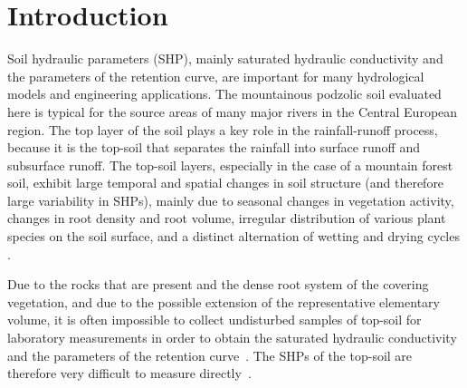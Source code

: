 \documentclass[review]{myarticle}
\begin{document}
\linenumbers

\section{Introduction}%

Soil hydraulic parameters (SHP), mainly saturated hydraulic conductivity and the parameters of the retention curve, are important for many hydrological models and engineering applications.  The mountainous podzolic soil evaluated here is typical for the source areas of many major rivers in the Central European region. The top layer of the soil plays a key role in the rainfall-runoff process, because it is the top-soil that separates the rainfall into surface runoff and subsurface runoff. The top-soil layers, especially in the case of a mountain forest soil, exhibit large temporal and spatial changes in soil structure (and therefore large variability in SHPs), mainly due to seasonal changes in vegetation activity, changes in root density and root volume, irregular distribution of various plant species on the soil surface, and a distinct alternation of wetting and drying cycles \citep{Fodor,Schwen, Leij, Mubarak}.



Due to the rocks that are present and the dense root system of the covering vegetation, and due to the possible extension of the representative elementary volume, it is often impossible to collect undisturbed samples of top-soil for laboratory measurements in order to obtain the saturated hydraulic conductivity and the parameters of the retention curve~\citep{Jacka1}. The SHPs of the top-soil are therefore very difficult to measure directly~\citep{Fodor, Jacka1}. 
\end{document}
